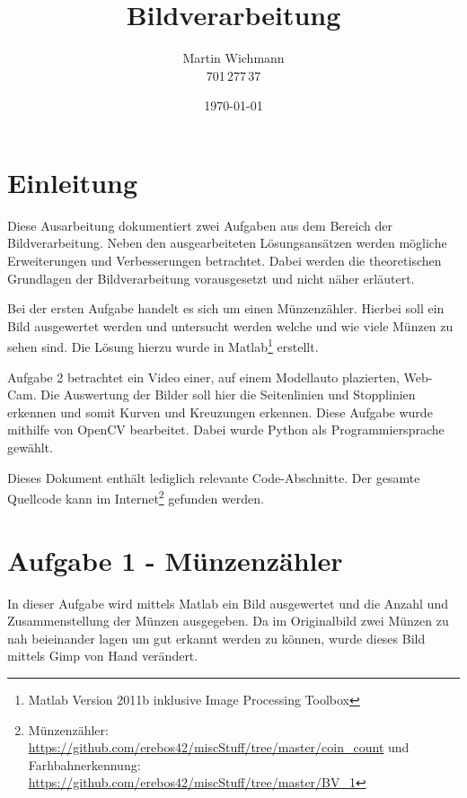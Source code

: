 \documentclass[a4paper,DIV=calc,ngerman]{scrartcl}
\begin{document}
\titlehead{}
\title{Bildverarbeitung}
\author{Martin Wichmann\\701\,277\,37}
\date{\today}

\maketitle
\tableofcontents

\thispagestyle{empty}

\newpage
\setcounter{page}{1}

\section{Einleitung}
\label{sec:Einleitung}
Diese Ausarbeitung dokumentiert zwei Aufgaben aus dem Bereich der Bildverarbeitung. Neben den ausgearbeiteten Lösungsansätzen werden mögliche Erweiterungen und Verbesserungen betrachtet. Dabei werden die theoretischen Grundlagen der Bildverarbeitung vorausgesetzt und nicht näher erläutert.

Bei der ersten Aufgabe handelt es sich um einen Münzenzähler. Hierbei soll ein Bild ausgewertet werden und untersucht werden welche und wie viele Münzen zu sehen sind. Die Lösung hierzu wurde in Matlab\footnote{Matlab Version 2011b inklusive Image Processing Toolbox} erstellt.

Aufgabe 2 betrachtet ein Video einer, auf einem Modellauto plazierten, Web-Cam. Die Auswertung der Bilder soll hier die Seitenlinien und Stopplinien erkennen und somit Kurven und Kreuzungen erkennen. Diese Aufgabe wurde mithilfe von OpenCV bearbeitet. Dabei wurde Python als Programmiersprache gewählt.

Dieses Dokument enthält lediglich relevante Code-Abschnitte. Der gesamte Quellcode kann im Internet\footnote{Münzenzähler: \url{https://github.com/erebos42/miscStuff/tree/master/coin_count} und Farhbahnerkennung: \url{https://github.com/erebos42/miscStuff/tree/master/BV_1}} gefunden werden.




\section{Aufgabe 1 - Münzenzähler}
\label{sec:aufgabe1}
In dieser Aufgabe wird mittels Matlab ein Bild ausgewertet und die Anzahl und Zusammenstellung der Münzen ausgegeben. Da im Originalbild zwei Münzen zu nah beieinander lagen um gut erkannt werden zu können, wurde dieses Bild mittels Gimp von Hand verändert.
\end{document}
